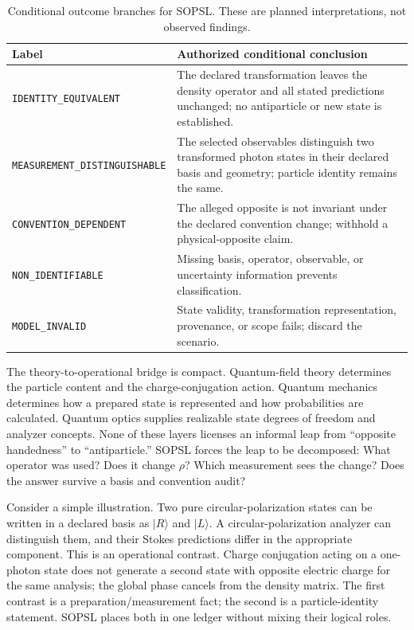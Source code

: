 \documentclass[conference]{../../../../Conference-LaTeX-template_10-17-19/IEEEtran}
\begin{document}
\begin{table}[!t]
\caption{Conditional outcome branches for SOPSL. These are planned interpretations, not observed findings.}
\label{tab:branches}
\centering
\footnotesize
\begin{tabularx}{\columnwidth}{lY}
\toprule
Label & Authorized conditional conclusion \\
\midrule
\texttt{IDENTITY\_EQUIVALENT} & The declared transformation leaves the density operator and all stated predictions unchanged; no antiparticle or new state is established. \\
\texttt{MEASUREMENT\_DISTINGUISHABLE} & The selected observables distinguish two transformed photon states in their declared basis and geometry; particle identity remains the same. \\
\texttt{CONVENTION\_DEPENDENT} & The alleged opposite is not invariant under the declared convention change; withhold a physical-opposite claim. \\
\texttt{NON\_IDENTIFIABLE} & Missing basis, operator, observable, or uncertainty information prevents classification. \\
\texttt{MODEL\_INVALID} & State validity, transformation representation, provenance, or scope fails; discard the scenario. \\
\bottomrule
\end{tabularx}
\end{table}

The theory-to-operational bridge is compact. Quantum-field theory determines the particle content and the charge-conjugation action. Quantum mechanics determines how a prepared state is represented and how probabilities are calculated. Quantum optics supplies realizable state degrees of freedom and analyzer concepts. None of these layers licenses an informal leap from ``opposite handedness'' to ``antiparticle.'' SOPSL forces the leap to be decomposed: What operator was used? Does it change $\rho$? Which measurement sees the change? Does the answer survive a basis and convention audit?

Consider a simple illustration. Two pure circular-polarization states can be written in a declared basis as $\lvert R\rangle$ and $\lvert L\rangle$. A circular-polarization analyzer can distinguish them, and their Stokes predictions differ in the appropriate component. This is an operational contrast. Charge conjugation acting on a one-photon state does not generate a second state with opposite electric charge for the same analysis; the global phase cancels from the density matrix. The first contrast is a preparation/measurement fact; the second is a particle-identity statement. SOPSL places both in one ledger without mixing their logical roles.
\end{document}
